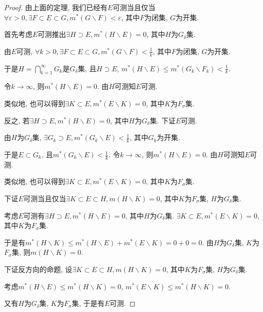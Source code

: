 \documentclass[theorem=false,mathfont=none,openany,sub3section]{easybook}
\begin{document}
\begin{proof}
  由上面的定理, 我们已经有$E$可测当且仅当$\forall \varepsilon>0, \exists F\subset E\subset G, m^{*}(G\backslash F)<\varepsilon $, 其中$F$为闭集, $G$为开集.\par
  首先考虑$E$可测推出$\exists H\supset E, m^{*}(H\backslash E)=0$, 其中$H$为$G_{\delta}$集.\par
  由$E$可测, $\forall k>0, \exists F\subset E\subset G, m^{*}(G\backslash F)<\frac{1}{k} $, 其中$F$为闭集, $G$为开集.\par
  于是$H=\bigcap_{k=1}^{\infty}G_k$是$G_{\delta}$集, 且$H\supset E$, $m^{*}(H\backslash E)\leqslant m^{*}(G_k\backslash F_k)<\frac{1}{k}$.\par
  令$k\to \infty$, 则$m^{*}(H\backslash E)=0$. 由$H$可测知$E$可测.\par
  类似地, 也可以得到$\exists K\subset E, m^{*}(E\backslash K)=0$, 其中$K$为$F_{\sigma}$集.\par
  反之, 若$\exists H\supset E, m^{*}(H\backslash E)=0$, 其中$H$为$G_{\delta}$集. 下证$E$可测.\par
  由$H$为$G_{\delta}$集, $\exists G_k\supset E, m^{*}(G_k\backslash E)<\frac{1}{k}$, 其中$G_k$为开集.\par
  于是$E\subset G_k$, 且$m^{*}(G_k\backslash E)<\frac{1}{k}$. 令$k \to \infty$, 则$m^{*}(H\backslash E)=0$. 由$H$可测知$E$可测.\par
  类似地, 也可以得到$\exists K\subset E, m^{*}(E\backslash K)=0$, 其中$K$为$F_{\sigma}$集.\par
  下证$E$可测当且仅当$\exists K\subset E\subset H, m(H\backslash K)=0$, 其中$K$为$F_{\sigma}$集, $H$为$G_{\delta}$集.\par
  考虑$E$可测有$\exists H\supset E, m^{*}(H\backslash E)=0$, 其中$H$为$G_{\delta}$集. $\exists K\subset E, m^{*}(E\backslash K)=0$, 其中$K$为$F_{\sigma}$集.\par
  于是有$m^{*}(H\backslash K)\leqslant m^{*}(H\backslash E)+m^{*}(E\backslash K)=0+0=0$. 由$H$为$G_{\delta}$集, $K$为$F_{\sigma}$集, 则$m(H\backslash K)=0$.\par
  下证反方向的命题, 设$\exists K\subset E\subset H, m(H\backslash K)=0$, 其中$K$为$F_{\sigma}$集, $H$为$G_{\delta}$集.\par
  考虑$m^{*}(H\backslash E)\leqslant m^{*}(H\backslash K)=0$, $m^{*}(E\backslash K)\leqslant m^{*}(H\backslash K)=0$.\par
  又有$H$为$G_{\delta}$集, $K$为$F_{\sigma}$集, 于是有$E$可测.\par
\end{proof}
\end{document}
